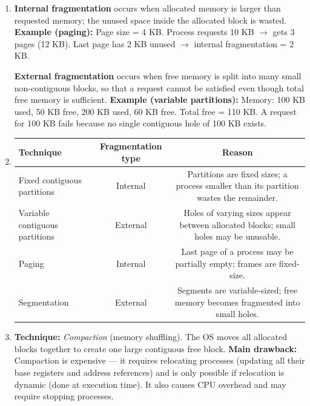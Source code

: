 \documentclass[11pt]{article}
\begin{document}
\begin{corrige}
\begin{enumerate}
\item \textbf{Internal fragmentation} occurs when allocated memory is larger than requested memory; the unused space inside the allocated block is wasted.  
\textbf{Example (paging):} Page size = 4 KB. Process requests 10 KB $\rightarrow$ gets 3 pages (12 KB). Last page has 2 KB unused $\rightarrow$ internal fragmentation = 2 KB.

\textbf{External fragmentation} occurs when free memory is split into many small non-contiguous blocks, so that a request cannot be satisfied even though total free memory is sufficient.  
\textbf{Example (variable partitions):} Memory: 100 KB used, 50 KB free, 200 KB used, 60 KB free. Total free = 110 KB. A request for 100 KB fails because no single contiguous hole of 100 KB exists.

\item 
\begin{center}
\begin{tabular}{|l|c|c|}
\hline
Technique & Fragmentation type & Reason \\
\hline
Fixed contiguous partitions & Internal & Partitions are fixed sizes; a process smaller than its partition wastes the remainder. \\
Variable contiguous partitions & External & Holes of varying sizes appear between allocated blocks; small holes may be unusable. \\
Paging & Internal & Last page of a process may be partially empty; frames are fixed-size. \\
Segmentation & External & Segments are variable-sized; free memory becomes fragmented into small holes. \\
\hline
\end{tabular}
\end{center}

\item \textbf{Technique:} \emph{Compaction} (memory shuffling). The OS moves all allocated blocks together to create one large contiguous free block.  
\textbf{Main drawback:} Compaction is expensive — it requires relocating processes (updating all their base registers and address references) and is only possible if relocation is dynamic (done at execution time). It also causes CPU overhead and may require stopping processes.
\end{enumerate}
\end{corrige}
\end{document}
